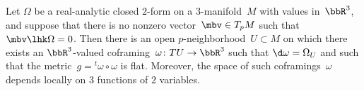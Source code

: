 \begin{Theorem}\label{nondegenerate-involutive-theorem}
Let $\Omega$ be a real-analytic closed $2$-form on a $3$-manifold~$M$ with values in~$\bbR^3$, and suppose that there is no nonzero vector~$\mbv\in T_pM$
such that $\mbv\lhk\Omega = 0$. Then there is an open $p$-neighborhood~$U\subset M$ on which there exists an $\bbR^3$-valued coframing~$\omega\colon TU\to\bbR^3$
such that $\d\omega = \Omega_U$ and such that the metric~$g = {}^t\omega\circ \omega$ is flat. Moreover, the space of such coframings~$\omega$ depends locally on $3$ functions of $2$ variables.
\end{Theorem}
